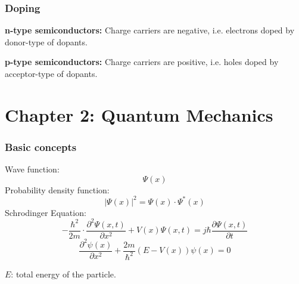 \documentclass{beamer}
\begin{document}
    \begin{frame} \frametitle{Doping}
        \par \textbf{n-type semiconductors:} Charge carriers are negative, i.e. electrons doped by donor-type of dopants.
        \par \textbf{p-type semiconductors:} Charge carriers are positive, i.e. holes doped by acceptor-type of dopants.
    \end{frame}


\section{Chapter 2: Quantum Mechanics}
    \begin{frame} \frametitle{Basic concepts}
        Wave function:
        \begin{equation*}
            \Psi(x)
        \end{equation*}
        Probability density function:
        \begin{equation*}
            \left| \Psi(x) \right|^2 = \Psi(x) \cdot \Psi^*(x)
        \end{equation*}
        Schrodinger Equation:
        \begin{equation*}
            - \frac{\hbar^2}{2m} \cdot \frac{\partial^2 \Psi(x, t)}{\partial x^2} + V(x) \Psi(x, t) = j \hbar \frac{\partial \Psi(x, t)}{\partial t}
        \end{equation*}
        \begin{equation*}
            \boxed{\frac{\partial^2 \psi(x)}{\partial x^2} + \frac{2m}{\hbar^2} \left( E - V(x) \right) \psi(x) = 0}
        \end{equation*}
        \begin{flushright}
            $E$: total energy of the particle.
        \end{flushright}
    \end{frame}
\end{document}

